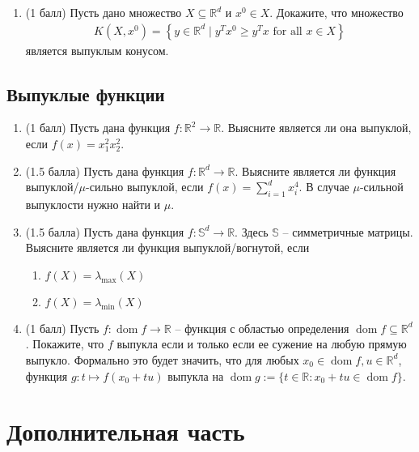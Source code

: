 \documentclass[a5paper,twoside,russian,8pt]{article}
\begin{document}
\begin{enumerate}[label=\textbf{Задача \arabic*.}]
    \item (1 балл) Пусть дано множество $X \subseteq \mathbb{R}^d$ и $x^0 \in X$. Докажите, что множество
    \begin{align*}
        K(X, x^0)=\left\{ y \in\mathbb{R}^d \mid y^T x^0 \geq y^T x \text{ for all } x \in X\right\}
    \end{align*}
    является выпуклым конусом.
\end{enumerate}

\subsection*{Выпуклые функции}
\begin{enumerate}[label=\textbf{Задача \arabic*.}]
    \item (1 балл) Пусть дана функция $f: \mathbb{R}^2 \to \mathbb{R}$. Выясните является ли она выпуклой, если $f(x) = x_1^2 x_2^2$.
    
    \item (1.5 балла) Пусть дана функция $f: \mathbb{R}^d \to \mathbb{R}$. Выясните является ли функция выпуклой/$\mu$-сильно выпуклой, если $f(x) = \sum\limits_{i=1}^{d} x_i^4$. В случае $\mu$-сильной выпуклости нужно найти и $\mu$.
    
    \item (1.5 балла) Пусть дана функция $f: \mathbb{S}^d \to \mathbb{R}$. Здесь $\mathbb{S}$ -- симметричные матрицы. Выясните является ли функция выпуклой/вогнутой, если
    \begin{enumerate}
        \item $f(X) = \lambda_{\max}(X)$
        \item $f(X) = \lambda_{\min}(X)$
    \end{enumerate}

    \item (1 балл) Пусть $f : \operatorname{dom} f \rightarrow \mathbb{R}$ -- функция с областью определения $\operatorname{dom} f \subseteq \mathbb{R}^d$. Покажите, что $f$ выпукла если и только если ее сужение на любую прямую выпукло. Формально это будет значить, что для любых $x_0 \in \operatorname{dom} f,u\in\mathbb{R}^d$, функция
$g: t\mapsto f(x_0 + tu)$
выпукла на  $\operatorname{dom} g:= \{{t\in\mathbb{R} : x_0 + tu\in \operatorname{dom} f}\}$.
\end{enumerate}

\newpage
\section*{Дополнительная часть}
\end{document}
